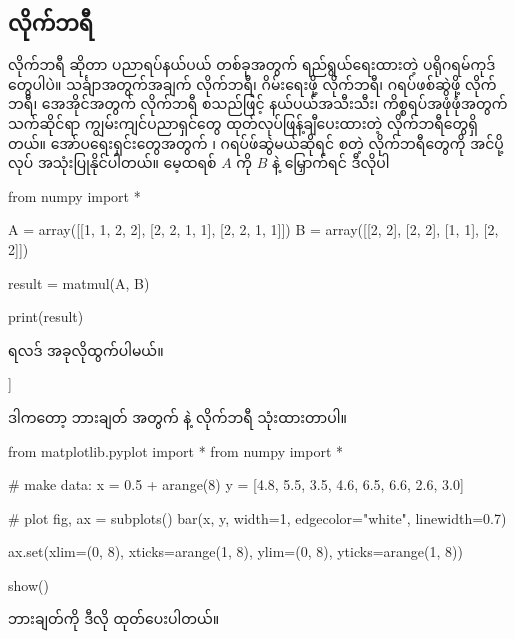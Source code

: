 \subsection*{လိုက်ဘရီ}
လိုက်ဘရီ  ဆိုတာ ပညာရပ်နယ်ပယ် တစ်ခုအတွက် ရည်ရွယ်ရေးထားတဲ့ ပရိုဂရမ်ကုဒ်တွေပါပဲ။ သင်္ချာအတွက်အချက် လိုက်ဘရီ၊ ဂိမ်းရေးဖို့ လိုက်ဘရီ၊  ဂရပ်ဖစ်ဆွဲဖို့ လိုက်ဘရီ၊ အေအိုင်အတွက် လိုက်ဘရီ စသည်ဖြင့် နယ်ပယ်အသီးသီး၊ ကိစ္စရပ်အဖုံဖုံအတွက် သက်ဆိုင်ရာ ကျွမ်းကျင်ပညာရှင်တွေ ထုတ်လုပ်ဖြန့်ချီပေးထားတဲ့ လိုက်ဘရီတွေရှိတယ်။  အော်ပရေးရှင်းတွေအတွက်  ၊ ဂရပ်ဖ်ဆွဲမယ်ဆိုရင်  စတဲ့ လိုက်ဘရီတွေကို အင်ပို့လုပ် အသုံးပြုနိုင်ပါတယ်။ မေ့ထရစ် $A$ ကို $B$ နဲ့ မြှောက်ရင် ဒီလိုပါ 
%
\begin{py}
from numpy import *

A = array([[1, 1, 2, 2],
           [2, 2, 1, 1],
           [2, 2, 1, 1]])
B = array([[2, 2],
           [2, 2],
           [1, 1],
           [2, 2]])

result = matmul(A, B)

print(result)

\end{py}
%
ရလဒ် အခုလိုထွက်ပါမယ်။ 
%
\begin{codetxt}
[[10 10]
 [11 11]
 [11 11]]
\end{codetxt}
%
ဒါကတော့ ဘားချတ် အတွက်  နဲ့  လိုက်ဘရီ သုံးထားတာပါ။  
%
\begin{py}
from matplotlib.pyplot import *
from numpy import *

# make data:
x = 0.5 + arange(8)
y = [4.8, 5.5, 3.5, 4.6, 6.5, 6.6, 2.6, 3.0]

# plot
fig, ax = subplots()
bar(x, y, width=1, edgecolor="white", linewidth=0.7)

ax.set(xlim=(0, 8), xticks=arange(1, 8),
       ylim=(0, 8), yticks=arange(1, 8))

show()
\end{py}
ဘားချတ်ကို ဒီလို ထုတ်ပေးပါတယ်။
%
\begin{figure}[tbh!]
\caption{} 
\label{fig:barchart}
\end{figure}

